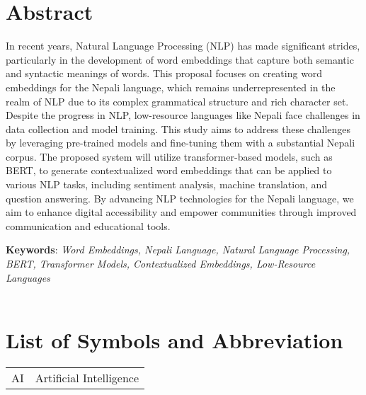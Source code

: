 		
		
		\large
			\chapter*{Abstract}
		\normalsize
        \noindent
		In recent years, Natural Language Processing (NLP) has made significant strides, particularly in the development of word embeddings that capture both semantic and syntactic meanings of words. This proposal focuses on creating word embeddings for the Nepali language, which remains underrepresented in the realm of NLP due to its complex grammatical structure and rich character set. Despite the progress in NLP, low-resource languages like Nepali face challenges in data collection and model training. This study aims to address these challenges by leveraging pre-trained models and fine-tuning them with a substantial Nepali corpus. The proposed system will utilize transformer-based models, such as BERT, to generate contextualized word embeddings that can be applied to various NLP tasks, including sentiment analysis, machine translation, and question answering. By advancing NLP technologies for the Nepali language, we aim to enhance digital accessibility and empower communities through improved communication and educational tools.

        \textbf{Keywords}: 
		\textit{Word Embeddings, Nepali Language, Natural Language Processing, BERT, Transformer Models, Contextualized Embeddings, Low-Resource Languages\\
 }\\

		\break


	    \tableofcontents

		\listoftables
		\break
		\pagebreak

		\listoffigures
		\break
	
	
	
		\Large
			\begingroup
				\let\clearpage\relax
				\chapter*{List of Symbols and Abbreviation}
			\endgroup
   
		\normalsize
		\begin{tabular}{p{1in}p{5in}} 
                AI & Artificial Intelligence\\
                
            \end{tabular}





		\break
		\pagebreak
		
	